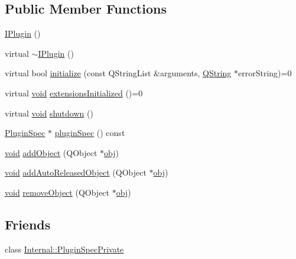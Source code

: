 \subsection*{Public Member Functions}
\begin{DoxyCompactItemize}
\item 
\hyperlink{class_extension_system_1_1_i_plugin_a5c43c107b8a3109755cc0e5a26fb5642}{I\-Plugin} ()
\item 
virtual \hyperlink{class_extension_system_1_1_i_plugin_a92763c9985354dc46cae781e3873a6b2}{$\sim$\-I\-Plugin} ()
\item 
virtual bool \hyperlink{class_extension_system_1_1_i_plugin_a9f3dc957317279daed393fdf4894e944}{initialize} (const Q\-String\-List \&arguments, \hyperlink{group___u_a_v_objects_plugin_gab9d252f49c333c94a72f97ce3105a32d}{Q\-String} $\ast$error\-String)=0
\item 
virtual \hyperlink{group___u_a_v_objects_plugin_ga444cf2ff3f0ecbe028adce838d373f5c}{void} \hyperlink{class_extension_system_1_1_i_plugin_a1db3a7fb242fca02229f9a3be4fd6610}{extensions\-Initialized} ()=0
\item 
virtual \hyperlink{group___u_a_v_objects_plugin_ga444cf2ff3f0ecbe028adce838d373f5c}{void} \hyperlink{class_extension_system_1_1_i_plugin_a65c16ebd3a6e89918a99af6515fe68cb}{shutdown} ()
\item 
\hyperlink{class_extension_system_1_1_plugin_spec}{Plugin\-Spec} $\ast$ \hyperlink{class_extension_system_1_1_i_plugin_a0406aee58b1b6f47d046a00e8a3968a8}{plugin\-Spec} () const 
\item 
\hyperlink{group___u_a_v_objects_plugin_ga444cf2ff3f0ecbe028adce838d373f5c}{void} \hyperlink{class_extension_system_1_1_i_plugin_a839e08a78deb150b1148ce10d099067b}{add\-Object} (Q\-Object $\ast$\hyperlink{glext_8h_a0c0d4701a6c89f4f7f0640715d27ab26}{obj})
\item 
\hyperlink{group___u_a_v_objects_plugin_ga444cf2ff3f0ecbe028adce838d373f5c}{void} \hyperlink{class_extension_system_1_1_i_plugin_af2782659463bdc328aef58f896ae3921}{add\-Auto\-Released\-Object} (Q\-Object $\ast$\hyperlink{glext_8h_a0c0d4701a6c89f4f7f0640715d27ab26}{obj})
\item 
\hyperlink{group___u_a_v_objects_plugin_ga444cf2ff3f0ecbe028adce838d373f5c}{void} \hyperlink{class_extension_system_1_1_i_plugin_a7f5bee6ed07af7f475b8b2c55c0d8ed4}{remove\-Object} (Q\-Object $\ast$\hyperlink{glext_8h_a0c0d4701a6c89f4f7f0640715d27ab26}{obj})
\end{DoxyCompactItemize}
\subsection*{Friends}
\begin{DoxyCompactItemize}
\item 
class \hyperlink{class_extension_system_1_1_i_plugin_ab527aa6637a3541a3260928aef682007}{Internal\-::\-Plugin\-Spec\-Private}
\end{DoxyCompactItemize}


